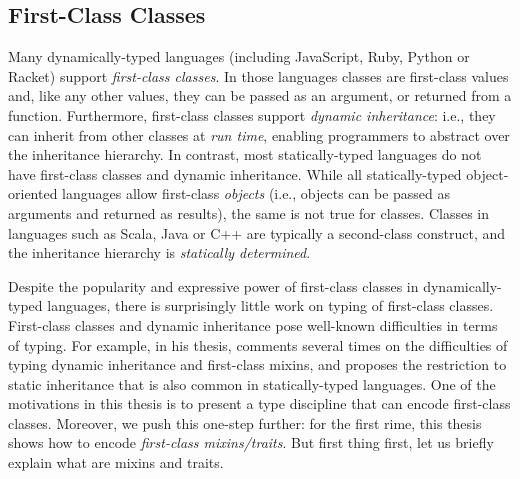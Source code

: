 \subsection{First-Class Classes}

Many dynamically-typed languages (including JavaScript, Ruby, Python or Racket)
support \emph{first-class classes}. In those languages classes are first-class
values and, like any other values, they can be passed as an argument, or
returned from a function. Furthermore, first-class classes support \emph{dynamic inheritance}:
i.e., they can inherit from other classes at \emph{run time},
enabling programmers to abstract over the inheritance hierarchy. %
In contrast, most statically-typed languages do not have first-class classes and
dynamic inheritance. While all statically-typed object-oriented languages allow first-class
\emph{objects} (i.e., objects can be passed as arguments and returned as
results), the same is not true for classes. Classes in languages such as Scala,
Java or C++ are typically a second-class construct, and the inheritance
hierarchy is \emph{statically determined}.

Despite the popularity and expressive power of first-class classes in
dynamically-typed languages, there is surprisingly little work on typing of
first-class classes. First-class classes and dynamic inheritance pose well-known
difficulties in terms of typing. For example, in his thesis,
\citet{bracha1992programming} comments several times on the difficulties of
typing dynamic inheritance and first-class mixins, and proposes the restriction
to static inheritance that is also common in statically-typed languages. One of
the motivations in this thesis is to present a type discipline that can encode
first-class classes. Moreover, we push this one-step further: for the first
rime, this thesis shows how to encode \textit{first-class mixins/traits}. But
first thing first, let us briefly explain what are mixins and traits.


